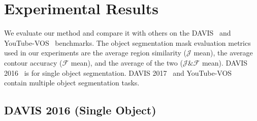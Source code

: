 \documentclass[runningheads]{llncs}
\begin{document}
\section{Experimental Results}
\label{sec:exp}

We evaluate our method and compare it with others on the DAVIS~\cite{davis2016,davis2017} and YouTube-VOS~\cite{youtubevos} benchmarks. The object segmentation mask evaluation metrics used in our experiments are the average region similarity ($\mathcal{J}$ mean), the average contour accuracy ($\mathcal{F}$ mean), and the average of the two (${\mathcal{J} \& \mathcal{F}}$ mean). DAVIS 2016~\cite{davis2016} is for single object segmentation. DAVIS 2017~\cite{davis2017} and YouTube-VOS~\cite{youtubevos} contain multiple object segmentation tasks.

\subsection{DAVIS 2016 (Single Object)}
\end{document}
